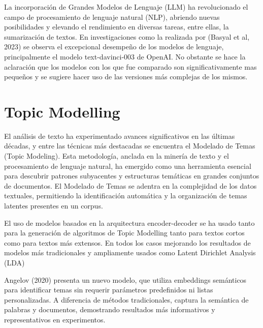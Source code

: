 La incorporación de Grandes Modelos de Lenguaje (LLM) ha revolucionado el campo de procesamiento de lenguaje natural (NLP), abriendo nuevas posibilidades y elevando el rendimiento en diversas tareas, entre ellas, la sumarización de textos. En investigaciones como la realizada por (Basyal et al, 2023)\cite{basyal2023text} se observa el excepcional desempeño de los modelos de lenguaje, principalmente el modelo text-davinci-003 de OpenAI\cite{openai}. No obstante se hace la aclaración que los modelos con los que fue comparado son significativamente mas peque\~nos y se sugiere hacer uso de las versiones más complejas de los mismos.

\section{Topic Modelling}

    El análisis de texto ha experimentado avances significativos en las últimas décadas, y entre las técnicas más destacadas se encuentra el Modelado de Temas (Topic Modeling). Esta metodología, anclada en la minería de texto y el procesamiento de lenguaje natural, ha emergido como una herramienta esencial para descubrir patrones subyacentes y estructuras temáticas en grandes conjuntos de documentos. El Modelado de Temas se adentra en la complejidad de los datos textuales, permitiendo la identificación automática y la organización de temas latentes presentes en un corpus\cite{lda2003}.

    El uso de modelos basados en la arquitectura encoder-decoder se ha usado tanto para la generación de algoritmos de Topic Modelling tanto para textos cortos\cite{neuraltm} como para textos más extensos\cite{tminemb}. En todos los casos mejorando los resultados de modelos más tradicionales y ampliamente usados como Latent Dirichlet Analysis (LDA)\cite{lda2003}   

    Angelov (2020)\cite{angelov2020top2vec} presenta un nuevo modelo, que utiliza embeddings semánticos para identificar temas sin requerir parámetros predefinidos ni listas personalizadas. A diferencia de métodos tradicionales, captura la semántica de palabras y documentos, demostrando resultados más informativos y representativos en experimentos.

